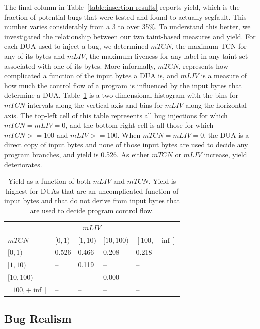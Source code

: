 The final column in Table~\ref{table:insertion-results} reports yield, which is the fraction of potential bugs that were tested and found to actually segfault.
This number varies considerably from a 3 to over 35\%.
To understand this better, we investigated the relationship between our two taint-based measures and yield.
For each DUA used to inject a bug, we determined $mTCN$, the maximum TCN for any of its bytes and $mLIV$, the maximum liveness for any label in any taint set associated with one of its bytes.  
More informally, $mTCN$, represents how complicated a function of the input bytes a DUA is, and $mLIV$ is a measure of how much the control flow of a program is influenced by the input bytes that determine a DUA.
Table~\ref{table:yield-breakdown} is a two-dimensional histogram with the bins for $mTCN$ intervals along the vertical axis and bins for $mLIV$ along the horizontal axis.
The top-left cell of this table represents all bug injections for which $mTCN=mLIV=0$, and the bottom-right cell is all those for which $mTCN>=100$ and $mLIV>=100$.
When $mTCN=mLIV=0$, the DUA is a direct copy of input bytes and none of those input bytes are used to decide any program branches, and yield is 0.526.
As either $mTCN$ or $mLIV$ increase, yield deteriorates.  

\begin{table}
\centering
\begin{tabular}{l|l|l|l|l} 
 & \multicolumn{3}{c}{$mLIV$} &  \\  
$mTCN$ &         $[0,1)$ & $[1,10)$ & $[10,100)$ & $[100,+\inf]$ \\  \hline 
$[0,1)$ &       0.526   & 0.466    & 0.208      & 0.218 \\
$[1,10)$ &      --      & 0.119    & --         & --    \\
$[10,100)$ &    --      & --       & 0.000      & --    \\
$[100,+\inf]$ & --      & --       & --         & -- \\ 
\end{tabular}
\caption{Yield as a function of both $mLIV$ and $mTCN$.  
Yield is highest for DUAs that are an uncomplicated function of input bytes and that do not derive from input bytes that are used to decide program control flow.}
\label{table:yield-breakdown}
\end{table}

\subsection{Bug Realism}

